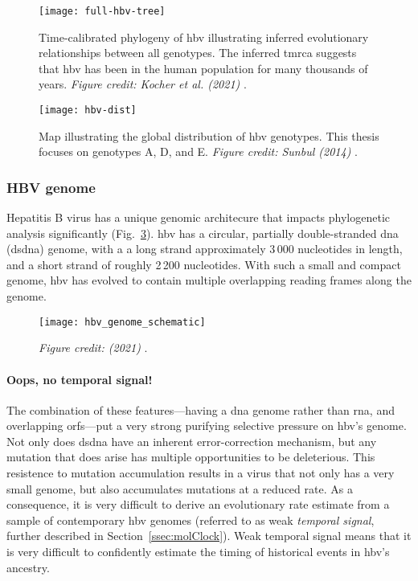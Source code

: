 \begin{figure}[ht]
  \centering
  \texttt{[image: full-hbv-tree]}
  \caption[Phylogeny of all HBV genotypes]{Time-calibrated phylogeny of \gls{hbv} illustrating inferred evolutionary relationships between all genotypes. The inferred \gls{tmrca} suggests that \gls{hbv} has been in the human population for many thousands of years. \textit{Figure credit: Kocher et al. (2021)} \citep{kocher2021ten}.
  }
  \label{fig:hbvFullTree}
\end{figure}

\begin{figure}[ht]
  \centering
  \texttt{[image: hbv-dist]}
  \caption[Global distribution of hepatitis B virus]{Map illustrating the global distribution of \gls{hbv} genotypes. This thesis focuses on genotypes A, D, and E.
  \textit{Figure credit: Sunbul (2014)} \citep{sunbul2014hepatitis}.
  }
  \label{fig:hbvDist}
\end{figure}

\subsubsection{HBV genome}
Hepatitis B virus has a unique genomic architecure that impacts phylogenetic analysis significantly (Fig.~\ref{fig:hbvGenome}).
\gls{hbv} has a circular, partially double-stranded \gls{dna} (ds\gls{dna}) genome, with a a long strand approximately 3\,000 nucleotides in length, and a short strand of roughly 2\,200 nucleotides.
With such a small and compact genome, \gls{hbv} has evolved to contain multiple overlapping reading frames along the genome.

\begin{figure}[ht]
  \centering
  \texttt{[image: hbv\_genome\_schematic]}
  \caption[Schematic of the hepatis B virus genome]{ \textit{Figure credit:  (2021)} \citep{kocher2021ten}.
  }
  \label{fig:hbvGenome}
\end{figure}

\paragraph*{Oops, no temporal signal!}
The combination of these features---having a \gls{dna} genome rather than \gls{rna}, and overlapping \gls{orf}s---put a very strong purifying selective pressure on \gls{hbv}'s genome.
Not only does ds\gls{dna} have an inherent error-correction mechanism, but any mutation that does arise has multiple opportunities to be deleterious.
This resistence to mutation accumulation results in a virus that not only has a very small genome, but also accumulates mutations at a reduced rate.
As a consequence, it is very difficult to derive an evolutionary rate estimate from a sample of contemporary \gls{hbv} genomes (referred to as weak \textit{temporal signal}, further described in Section~\ref{ssec:molClock}).
Weak temporal signal means that it is very difficult to confidently estimate the timing of historical events in \gls{hbv}'s ancestry.

